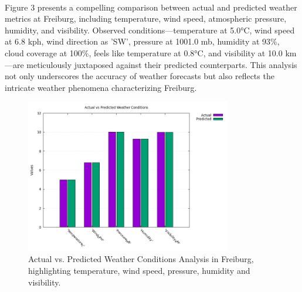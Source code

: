 \documentclass[11pt]{article}
\begin{document}
\paragraph{}Figure 3 presents a compelling comparison between actual and predicted weather metrics at Freiburg, including temperature, wind speed, atmospheric pressure, humidity, and visibility. Observed conditions—temperature at 5.0°C, wind speed at 6.8 kph, wind direction as 'SW', pressure at 1001.0 mb, humidity at 93\%, cloud coverage at 100\%, feels like temperature at 0.8°C, and visibility at 10.0 km—are meticulously juxtaposed against their predicted counterparts. This analysis not only underscores the accuracy of weather forecasts but also reflects the intricate weather phenomena characterizing Freiburg.
\begin{figure}[h]
\centering
\includegraphics[width=0.8\textwidth]{data/graph/weather_comparison_graph.png}
\caption{Actual vs. Predicted Weather Conditions Analysis in Freiburg, highlighting temperature, wind speed, pressure, humidity and visibility.}
\end{figure}
\end{document}
